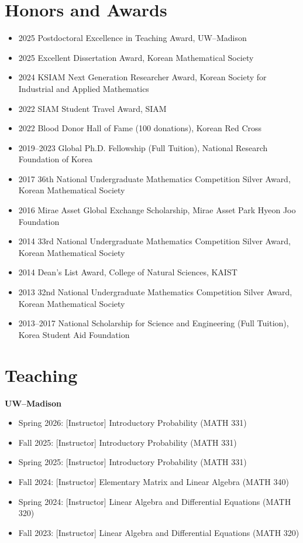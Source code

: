 \documentclass[margin,line]{res}
\newcommand{\vspacesection}{\vspace*{-1.5mm}}
\begin{document}
\begin{resume}
\section{\sc Honors and Awards}
\begin{itemize}[leftmargin=-1pt, label={}]
    \item 2025 Postdoctoral Excellence in Teaching Award, UW–Madison
    \item 2025 Excellent Dissertation Award, Korean Mathematical Society
    \item 2024 KSIAM Next Generation Researcher Award, Korean Society for Industrial and Applied Mathematics
    \item 2022 SIAM Student Travel Award, SIAM
    \item 2022 Blood Donor Hall of Fame (100 donations), Korean Red Cross
    \item 2019–2023 Global Ph.D. Fellowship (Full Tuition), National Research Foundation of Korea
    \item 2017 36th National Undergraduate Mathematics Competition Silver Award, Korean Mathematical Society
    \item 2016 Mirae Asset Global Exchange Scholarship, Mirae Asset Park Hyeon Joo Foundation
    \item 2014 33rd National Undergraduate Mathematics Competition Silver Award, Korean Mathematical Society
    \item 2014 Dean's List Award, College of Natural Sciences, KAIST
    \item 2013 32nd National Undergraduate Mathematics Competition Silver Award, Korean Mathematical Society
    \item 2013–2017 National Scholarship for Science and Engineering (Full Tuition), Korea Student Aid Foundation
\end{itemize}
\vspacesection
\section{\sc Teaching}
\textbf{UW--Madison}
\begin{itemize}
    \item Spring 2026: [Instructor] Introductory Probability (MATH 331)
    \item Fall 2025: [Instructor] Introductory Probability (MATH 331)
    \item Spring 2025: [Instructor] Introductory Probability (MATH 331)
    \item Fall 2024: [Instructor] Elementary Matrix and Linear Algebra (MATH 340)
    \item Spring 2024: [Instructor] Linear Algebra and Differential Equations (MATH 320)
    \item Fall 2023: [Instructor] Linear Algebra and Differential Equations (MATH 320)
\end{itemize}
\vspacesection


\end{resume}
\end{document}

